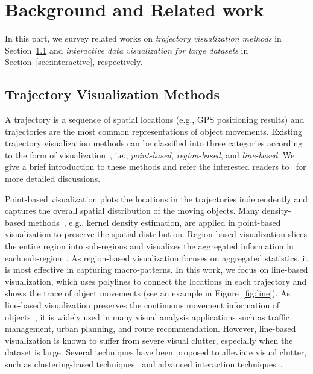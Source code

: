 \section{Background and Related work}\label{sec:rel}

In this part, we survey related works on \textit{trajectory visualization methods} in Section~\ref{sec:trajvisana} and \textit{interactive data visualization for large datasets} in Section~\ref{sec:interactive}, respectively.

\subsection{Trajectory Visualization Methods}\label{sec:trajvisana}
A trajectory is a sequence of spatial locations (e.g., GPS positioning results) and trajectories are the most common representations of object movements. Existing trajectory visualization methods can be classified into three categories according to the form of visualization~\cite{chen2015survey}, i.e., \textit{point-based}, \textit{region-based}, and \textit{line-based}. We give a brief introduction to these methods and refer the interested readers to~\cite{chen2015survey} for more detailed discussions.


Point-based visualization plots the locations in the trajectories independently and captures the overall spatial distribution of the moving objects. Many density-based methods~\cite{liu2013vait,yang2016exploring,chae2014public,borruso2008network}, 
e.g., kernel density estimation, are applied in point-based visualization to preserve the spatial distribution. Region-based visualization slices the entire region into sub-regions and visualizes the aggregated information in each sub-region~\cite{guo2009flow,von2015mobilitygraphs}.
As region-based visualization focuses on aggregated statistics, it is most effective in capturing macro-patterns. In this work, we focus on line-based visualization, which uses polylines to connect the locations in each trajectory and shows the trace of object movements (see an example in Figure~\ref{fig:line}). As line-based visualization preserves the continuous movement information of objects~\cite{guo2011tripvista,hurter2009fromdady}, it is widely used in many visual analysis applications such as traffic management, urban planning, and route recommendation. However, line-based visualization is known to suffer from severe visual clutter, especially when the dataset is large. Several techniques have been proposed to alleviate visual clutter, such as clustering-based techniques~\cite{von2015mobilitygraphs}
and advanced interaction techniques~\cite{ferreira2013visual}.



